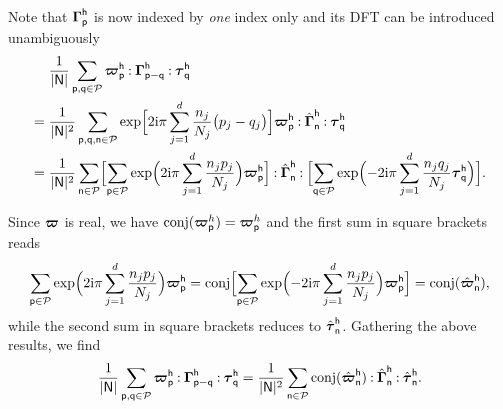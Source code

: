 Note that \(\boldsymbol\Gamma_{\mathsf{p}}^{\mathsf{h}}\) is now indexed by \emph{one}
index only and its DFT can be introduced unambiguously
\begin{equation}
  \begin{aligned}[b]
    &\frac{1}{\lvert\mathsf N\rvert}\sum_{\mathsf{p}, \mathsf{q}\in\mathcal{P}}
    \boldsymbol\varpi_{\mathsf{p}}^{\mathsf{h}}\mathbin{\mathord{:}}\boldsymbol\Gamma_{\mathsf p-\mathsf q}^{\mathsf h}
    \mathbin{\mathord{:}}\boldsymbol\tau_{\mathsf{q}}^{\mathsf{h}}\\
    ={}&\frac1{\lvert\mathsf N\rvert^2}\sum_{\mathsf p, \mathsf q, \mathsf n\in\mathcal{P}}
    \exp\Bigl[2\mathrm i\pi\sum_{j=1}^d\frac{n_j}{N_j}\bigl(p_j-q_j\bigr)\Bigr]
    \boldsymbol\varpi_{\mathsf{p}}^{\mathsf{h}}\mathbin{\mathord{:}}\hat{\boldsymbol\Gamma}_{\mathsf n}^{\mathsf h}
    \mathbin{\mathord{:}}\boldsymbol\tau_{\mathsf q}^{\mathsf h}\\
    ={}&\frac{1}{\lvert\mathsf N\rvert^2}
    \sum_{\mathsf n\in\mathcal{P}}\Bigl[\sum_{\mathsf{p}\in\mathcal{P}}
    \exp\Bigl(2\mathrm i\pi\sum_{j=1}^d\frac{n_jp_j}{N_j}\Bigr)
    \boldsymbol\varpi_{\mathsf p}^{\mathsf h}\Bigr]\mathbin{\mathord{:}}\hat{\boldsymbol\Gamma}_{\mathsf n}^{\mathsf h}
    \mathbin{\mathord{:}}\Bigl[\sum_{\mathsf q\in\mathcal{P}}\exp\Bigl(-2\mathrm i\pi\sum_{j=1}^d
    \frac{n_jq_j}{N_j}\boldsymbol\tau_{\mathsf q}^{\mathsf{h}}\Bigr)\Bigr].
  \end{aligned}
\end{equation}

Since \(\boldsymbol\varpi\) is real, we have
\(\operatorname{conj}(\boldsymbol\varpi_{\mathsf p}^h)=\boldsymbol\varpi_{\mathsf p}^h\) and the first sum
in square brackets reads
\begin{equation}
  \sum_{\mathsf{p}\in\mathcal{P}}\exp\Bigl(2\mathrm i\pi\sum_{j=1}^d\frac{n_jp_j}{N_j}\Bigr)
  \boldsymbol\varpi_{\mathsf p}^{\mathsf h}=\operatorname{conj}\Bigl[\sum_{\mathsf{p}\in\mathcal{P}}
  \exp\Bigl(-2\mathrm i\pi\sum_{j=1}^d\frac{n_jp_j}{N_j}\Bigr)
  \boldsymbol\varpi_{\mathsf p}^{\mathsf h}\Bigr]
  =\operatorname{conj}(\hat{\boldsymbol\varpi}_{\mathsf n}^{\mathsf h}),
\end{equation}
while the second sum in square brackets reduces to \(\hat{\boldsymbol\tau}_{\mathsf
  n}^{\mathsf h}\). Gathering the above results, we find
\begin{equation}
  \frac{1}{\lvert\mathsf N\rvert}\sum_{\mathsf p, \mathsf q\in\mathcal{P}}
  \boldsymbol\varpi_{\mathsf p}^{\mathsf h}\mathbin{\mathord{:}}\boldsymbol\Gamma_{\mathsf p-\mathsf q}^{\mathsf h}
  \mathbin{\mathord{:}}\boldsymbol\tau_{\mathsf q}^{\mathsf h}=\frac1{\lvert\mathsf N\rvert^2}
  \sum_{\mathsf n\in\mathcal{P}}\operatorname{conj}(\hat{\boldsymbol\varpi}_{\mathsf n}^{\mathsf h})
  \mathbin{\mathord{:}}\hat{\boldsymbol\Gamma}_{\mathsf n}^{\mathsf h}\mathbin{\mathord{:}}
  \hat{\boldsymbol\tau}_{\mathsf n}^{\mathsf h}.
\end{equation}

